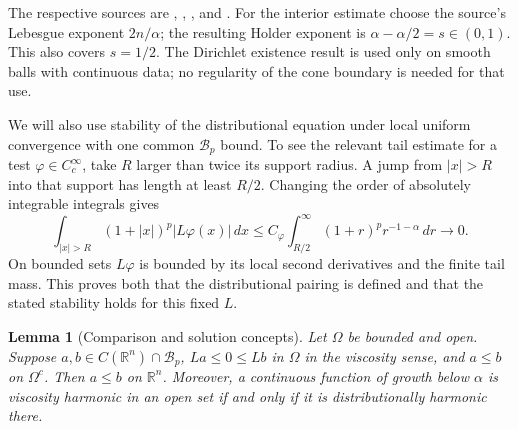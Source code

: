 \documentclass[11pt]{article}
\newtheorem{lemma}[theorem]{Lemma}
\numberwithin{equation}{section}
\newcommand{\R}{\mathbb R}
\newcommand{\Bcal}{\mathcal B}
\begin{document}
The respective sources are \cite[Lemma 2.2.30 and Theorem 2.4.3]{FR},
\cite[Theorem 2.6.12]{FR}, \cite[Theorem 2.4.15(b)]{FR}, and
\cite[Lemma B.1.4]{FR}. For the interior estimate choose the source's
Lebesgue exponent \(2n/\alpha\); the resulting Holder exponent is
\(\alpha-\alpha/2=s\in(0,1)\). This also covers \(s=1/2\).
The Dirichlet existence result is used only on smooth balls with continuous
data; no regularity of the cone boundary is needed for that use.

We will also use stability of the distributional equation under local
uniform convergence with one common \(\Bcal_p\) bound. To see the relevant
tail estimate for a test \(\varphi\in C_c^\infty\), take \(R\) larger
than twice its support radius. A jump from \(|x|>R\) into that support has
length at least \(R/2\). Changing the order of absolutely integrable
integrals gives
\begin{equation}\label{eq:test-tail}
 \int_{|x|>R}(1+|x|)^p|L\varphi(x)|\,dx
 \le C_\varphi\int_{R/2}^\infty(1+r)^p r^{-1-\alpha}\,dr
 \longrightarrow0.
\end{equation}
On bounded sets \(L\varphi\) is bounded by its local second derivatives
and the finite tail mass. This proves both that the distributional pairing
is defined and that the stated stability holds for this fixed \(L\).

\begin{lemma}[Comparison and solution concepts]\label{lem:comparison}
Let \(\Omega\) be bounded and open. Suppose \(a,b\in C(\R^n)\cap\Bcal_p\),
\(La\le0\le Lb\) in \(\Omega\) in the viscosity sense, and
\(a\le b\) on \(\Omega^c\). Then \(a\le b\) on \(\R^n\).
Moreover, a continuous function of growth below \(\alpha\) is viscosity
harmonic in an open set if and only if it is distributionally harmonic there.
\end{lemma}
\end{document}
